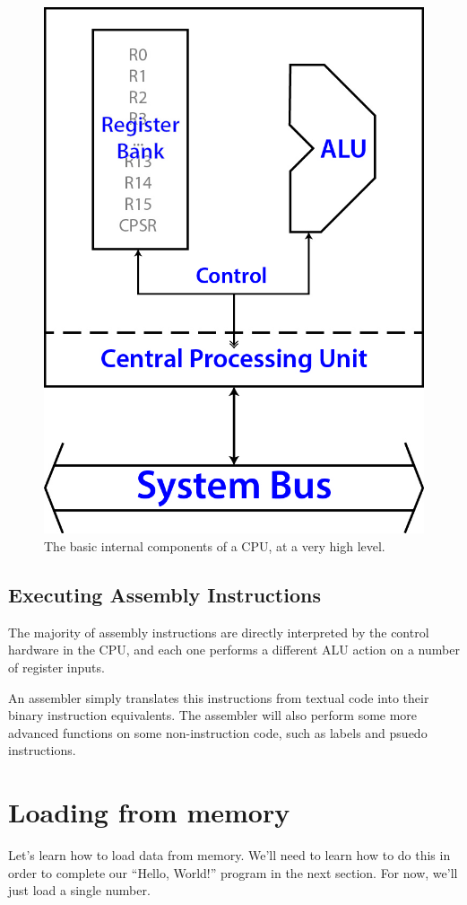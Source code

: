 \documentclass[a4paper, twocolumn, twoside, 11pt]{article}
\begin{document}
			\begin{figure}[h]
				\centering
				\includegraphics[width=0.7\linewidth]{img/3box_2}
				\caption[CPU box model]{The basic internal components of a CPU, at a very high level.}
				\label{fig:3box_2}
			\end{figure}
			
		\subsection*{Executing Assembly Instructions}
		
		The majority of assembly instructions are directly interpreted by the control hardware in the CPU, and each one performs a different ALU action on a number of register inputs.
		
		An assembler simply translates this instructions from textual code into their binary instruction equivalents. The assembler will also perform some more advanced functions on some non-instruction code, such as labels and psuedo instructions.
	
	\newpage
	\section{Loading from memory}
	
		Let's learn how to load data from memory. We'll need to learn how to do this in order to complete our ``Hello, World!'' program in the next section. For now, we'll just load a single number.
		
\end{document}
